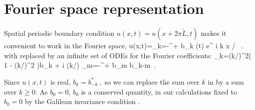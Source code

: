 \section{Fourier space representation} \label{s:FourierModes}
% 

%
\noindent
Spatial periodic boundary condition $u(x,t)=u(x+2\pi\tilde{L},t)$
makes it convenient to work in the Fourier space, 
\beq
  u(x,t)=\sum_{k=-\infty}^{+\infty} b_k (t) e^{ i k x / }
\, .
with  replaced by an infinite set of 
ODEs for the Fourier coefficients:
\beq
_k=(k/)^2\left( 1 - (k/)^2  \right)b_k 
 	 + i (k/) \sum_{m=-\infty}^{+\infty} b_m b_{k-m}
\,.
%
%

Since $u(x,t)$ is real,
$ %
b_k=b_{-k}^*
\,,
$ %
so we can replace the sum over $k$ in  by a
sum over $k \geq 0$.
As  $\dot{b_0}=0$, $b_0$ is a conserved quantity,
in our calculations
fixed to $b_0=0$ by
the Galilean invariance condition .


